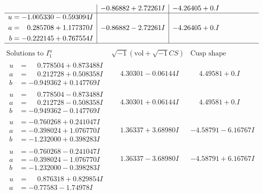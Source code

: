 \documentclass[1p]{elsarticle_modified}
\theoremstyle{definition}
\newcommand{\I}{\sqrt{-1}}
\begin{document}
$$\begin{array}{c|c|c}
 & -0.86882 + 2.72261 I & -4.26405 + 0. I\phantom{ +0.000000I} \\ \hline\begin{aligned}
u &= -1.005330 - 0.593094 I \\
a &= \phantom{-}0.285708 + 1.177370 I \\
b &= -0.222145 + 0.767554 I\end{aligned}
 & -0.86882 - 2.72261 I & -4.26405 + 0. I\phantom{ +0.000000I}\\
 \hline 
 \end{array}$$\newpage$$\begin{array}{c|c|c}  
\text{Solutions to }I^u_{1}& \I (\text{vol} + \sqrt{-1}CS) & \text{Cusp shape}\\
 \hline 
\begin{aligned}
u &= \phantom{-}0.778504 + 0.873488 I \\
a &= \phantom{-}0.212728 + 0.508358 I \\
b &= -0.949362 + 0.147769 I\end{aligned}
 & \phantom{-}4.30301 - 0.06144 I & \phantom{-}4.49581 + 0. I\phantom{ +0.000000I} \\ \hline\begin{aligned}
u &= \phantom{-}0.778504 - 0.873488 I \\
a &= \phantom{-}0.212728 - 0.508358 I \\
b &= -0.949362 - 0.147769 I\end{aligned}
 & \phantom{-}4.30301 + 0.06144 I & \phantom{-}4.49581 + 0. I\phantom{ +0.000000I} \\ \hline\begin{aligned}
u &= -0.760268 + 0.241047 I \\
a &= -0.398024 + 1.076770 I \\
b &= -1.232000 + 0.398283 I\end{aligned}
 & \phantom{-}1.36337 + 3.68980 I & -4.58791 - 6.16767 I \\ \hline\begin{aligned}
u &= -0.760268 - 0.241047 I \\
a &= -0.398024 - 1.076770 I \\
b &= -1.232000 - 0.398283 I\end{aligned}
 & \phantom{-}1.36337 - 3.68980 I & -4.58791 + 6.16767 I \\ \hline\begin{aligned}
u &= \phantom{-}0.876318 + 0.829854 I \\
a &= -0.77583 - 1.74978 I \\

\end{aligned}
\end{array}$$
\end{document}
